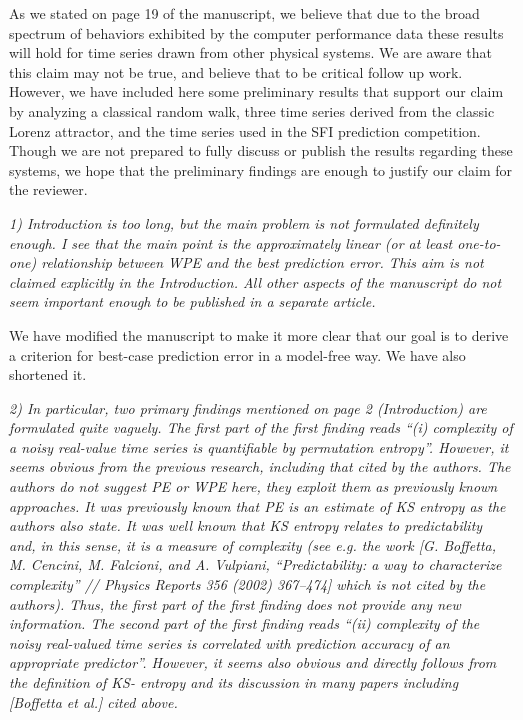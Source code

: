\documentclass[12pt]{article}
\newcommand{\alert}[1]{{\color{red}#1}}
\begin{document}
As we stated on page 19 of the manuscript, we believe that due to the broad
spectrum of behaviors exhibited by the computer performance data these results
will hold for time series drawn from other physical systems. We are aware that
this claim may not be true, and believe that to be critical follow up work.
\alert{However, we have included here some preliminary results that support our
claim by analyzing a classical random walk, three time series derived from the
classic Lorenz attractor, and the time series used in the SFI prediction
competition.} Though we are not prepared to fully discuss or publish the results
regarding these systems, we hope that the preliminary findings are enough to
justify our claim for the reviewer.

\emph{1) Introduction is too long, but the main problem is not formulated
definitely enough. I see that the main point is the approximately linear (or at
least one-to-one) relationship between WPE and the best prediction error. This
aim is not claimed explicitly in the Introduction. All other aspects of the
manuscript do not seem important enough to be published in a separate article.}

\alert{We have modified the manuscript to make it more clear that our goal is to
derive a criterion for best-case prediction error in a model-free way. We have
also shortened it.}

\emph{2) In particular, two primary findings mentioned on page 2 (Introduction)
are formulated quite vaguely. The first part of the first finding reads ``(i)
complexity of a noisy real-value time series is quantifiable by permutation
entropy''. However, it seems obvious from the previous research, including that
cited by the authors. The authors do not suggest PE or WPE here, they exploit
them as previously known approaches. It was previously known that PE is an
estimate of KS entropy as the authors also state. It was well known that KS
entropy relates to predictability and, in this sense, it is a measure of
complexity (see e.g. the work [G. Boffetta, M. Cencini, M. Falcioni, and A.
Vulpiani, ``Predictability: a way to characterize complexity'' // Physics
Reports 356 (2002) 367–474] which is not cited by the authors). Thus, the first
part of the first finding does not provide any new information. The second part
of the first finding reads ``(ii) complexity of the noisy real-valued time
series is correlated with prediction accuracy of an appropriate predictor''.
However, it seems also obvious and directly follows from the definition of KS-
entropy and its discussion in many papers including [Boffetta et al.] cited
above.}
\end{document}
